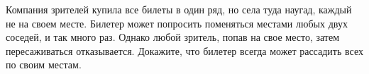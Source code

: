 Компания зрителей купила все билеты в один ряд, но села туда наугад, каждый не на своем месте. Билетер
может попросить поменяться местами любых двух соседей, и так много раз. Однако любой зритель, попав на
свое место, затем пересаживаться отказывается. Докажите, что билетер всегда может рассадить всех по своим
местам.
